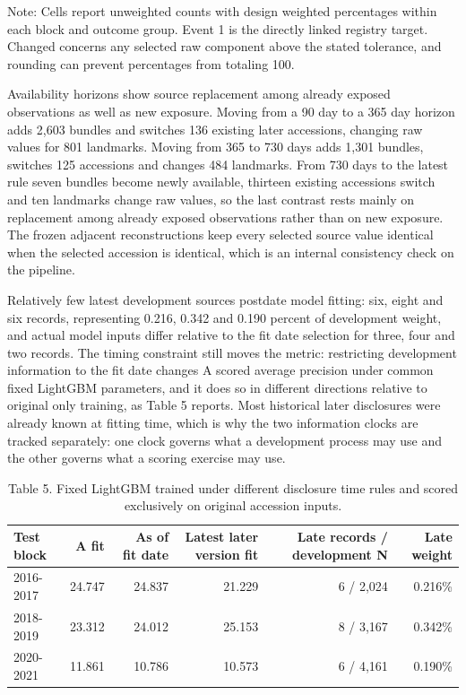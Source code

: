 \documentclass[10pt,a4paper,twocolumn]{article}
\begin{document}
Note: Cells report unweighted counts with design weighted percentages within each block and outcome group. Event 1 is the directly linked registry target. Changed concerns any selected raw component above the stated tolerance, and rounding can prevent percentages from totaling 100.

Availability horizons show source replacement among already exposed observations as well as new exposure. Moving from a 90 day to a 365 day horizon adds 2,603 bundles and switches 136 existing later accessions, changing raw values for 801 landmarks. Moving from 365 to 730 days adds 1,301 bundles, switches 125 accessions and changes 484 landmarks. From 730 days to the latest rule seven bundles become newly available, thirteen existing accessions switch and ten landmarks change raw values, so the last contrast rests mainly on replacement among already exposed observations rather than on new exposure. The frozen adjacent reconstructions keep every selected source value identical when the selected accession is identical, which is an internal consistency check on the pipeline.

Relatively few latest development sources postdate model fitting: six, eight and six records, representing 0.216, 0.342 and 0.190 percent of development weight, and actual model inputs differ relative to the fit date selection for three, four and two records. The timing constraint still moves the metric: restricting development information to the fit date changes A scored average precision under common fixed LightGBM parameters, and it does so in different directions relative to original only training, as Table 5 reports. Most historical later disclosures were already known at fitting time, which is why the two information clocks are tracked separately: one clock governs what a development process may use and the other governs what a scoring exercise may use.

\begin{table}[tbp]
\centering
\footnotesize
\caption{Table 5. Fixed LightGBM trained under different disclosure time rules and scored exclusively on original accession inputs.}
\label{main-tab-4}
\begin{tabular}{lrrrrr}
\toprule
Test block & A fit & As of fit date & Latest later version fit & Late records / development N & Late weight \\
\midrule
2016-2017 & 24.747 & 24.837 & 21.229 & 6 / 2,024 & 0.216\% \\
2018-2019 & 23.312 & 24.012 & 25.153 & 8 / 3,167 & 0.342\% \\
2020-2021 & 11.861 & 10.786 & 10.573 & 6 / 4,161 & 0.190\% \\
\bottomrule
\end{tabular}
\end{table}
\end{document}
